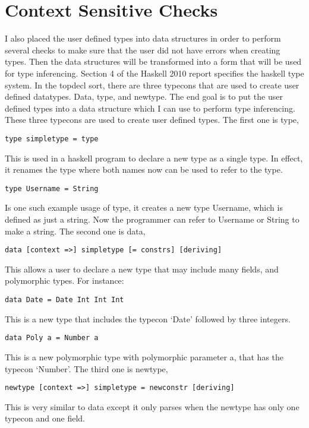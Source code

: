 \chapter{Context Sensitive Checks}
I also placed the user defined types into data structures in order to perform several checks to make sure that the user did not have errors when creating types. Then the data structures will be transformed into a form that will be used for type inferencing.
Section 4 of the Haskell 2010 report specifies the haskell type system.
In the topdecl sort, there are three typecons that are used to create user defined datatypes. Data, type, and newtype. The end goal is to put the user defined types into a data structure which I can use to perform type inferencing. These three typecons are used to create user defined types.
The first one is type,
	\begin{lstlisting}
type simpletype = type 
	\end{lstlisting}
This is used in a haskell program to declare a new type as a single type. In effect, it renames the type where both names now can be used to refer to the type.
	\begin{lstlisting}
type Username = String
	\end{lstlisting}
Is one such example usage of type, it creates a new type Username, which is defined as just a string. Now the programmer can refer to Username or String to make a string.
	The second one is data,
	\begin{lstlisting}
data [context =>] simpletype [= constrs] [deriving]
	\end{lstlisting}
This allows a user to declare a new type that may include many fields, and polymorphic types. For instance:
	\begin{lstlisting}
data Date = Date Int Int Int
	\end{lstlisting}
This is a new type that includes the typecon ‘Date’ followed by three integers.
	\begin{lstlisting}
data Poly a = Number a
	\end{lstlisting}
This is a new polymorphic type with polymorphic parameter a, that has the typecon ‘Number’.
	The third one is newtype,
	\begin{lstlisting}
newtype [context =>] simpletype = newconstr [deriving]
\end{lstlisting}
This is very similar to data except it only parses when the newtype has only one typecon and one field.

